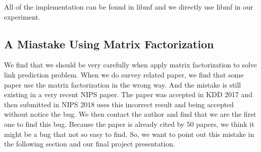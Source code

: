 \documentclass[12pt]{article}
\begin{document}
All of the implementation can be found in libmf\cite{libmf} and we directly use libmf in our experiment.

\subsection{A Miastake Using Matrix Factorization}
We find that we should be very carefully when apply matrix factorization to solve link prediction problem.
When we do survey related paper, we find that some paper use the matrix factorization in the wrong way. And the mistake is still existing in a very recent NIPS paper. The paper was accepted in KDD 2017 and then submitted in NIPS 2018 uses this incorrect result and being accepted without notice the bug. We then contact the author and  find that we are the first one to find this bug. Because the paper is already cited by 50 papers, we think it might be a bug that not so easy to find. So, we want to point out this mistake in the following section and our final project presentation.   
\end{document}
